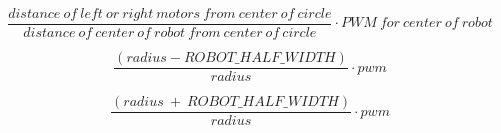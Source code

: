 \documentclass[10pt]{book}
\begin{document}
\begin{mdSnippets}
\begin{mdDisplaySnippet}[e8cafa34b9965bc9800090f872756b30]%
\begin{mdDiv}[class={mathdisplay,math-display},color={},math-needpdf={}]%
\[%
\frac{distance \ of \ left \ or \ right \ motors \ from \ center \ of \ circle}{distance \ of \ center \ of \ robot \ from \ center \ of \ circle} \cdot PWM \ for \ center \ of \ robot
\]%
\end{mdDiv}%

\end{mdDisplaySnippet}%
\begin{mdDisplaySnippet}%
\begin{mdDiv}[class={mathdisplay,math-display},color={},math-needpdf={}]%
\[%
\frac{(radius - ROBOT\_HALF\_WIDTH)} {radius} \cdot pwm
\]%
\end{mdDiv}%

\end{mdDisplaySnippet}%
\begin{mdDisplaySnippet}[7e3088bf66eceaede9e261a0e20f7f24]%
\begin{mdDiv}[class={mathdisplay,math-display},color={},math-needpdf={}]%
\[%
\frac{(radius \ + \ ROBOT\_HALF\_WIDTH)} {radius} \cdot pwm
\]%
\end{mdDiv}%


\end{mdDisplaySnippet}
\end{mdSnippets}
\end{document}
